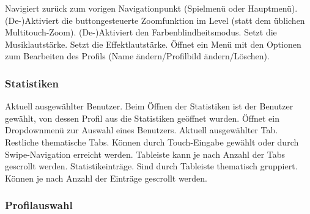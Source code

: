 \begin{requirements}
 Navigiert zurück zum vorigen Navigationpunkt (Spielmenü oder Hauptmenü).
 (De-)Aktiviert die buttongesteuerte Zoomfunktion im Level (statt dem üblichen Multitouch-Zoom).
 (De-)Aktiviert den Farbenblindheitsmodus.
 Setzt die Musiklautstärke.
 Setzt die Effektlautstärke.
 Öffnet ein Menü mit den Optionen zum Bearbeiten des Profils (Name ändern/Profilbild ändern/Löschen).
\end{requirements}

\subsubsection{Statistiken}

\begin{center}
\setlength\fboxsep{20pt}
\setlength\fboxrule{1pt}
\end{center}

\begin{requirements}
 Aktuell ausgewählter Benutzer. Beim Öffnen der Statistiken ist der Benutzer gewählt, von dessen Profil aus die Statistiken geöffnet wurden. Öffnet ein Dropdownmenü zur Auswahl eines Benutzers.
 Aktuell ausgewählter Tab.
 Restliche thematische Tabs. Können durch Touch-Eingabe gewählt oder durch Swipe-Navigation erreicht werden. Tableiste kann je nach Anzahl der Tabs gescrollt werden.
 Statistikeinträge. Sind durch Tableiste thematisch gruppiert. Können je nach Anzahl der Einträge gescrollt werden.
\end{requirements}

\subsubsection{Profilauswahl}

